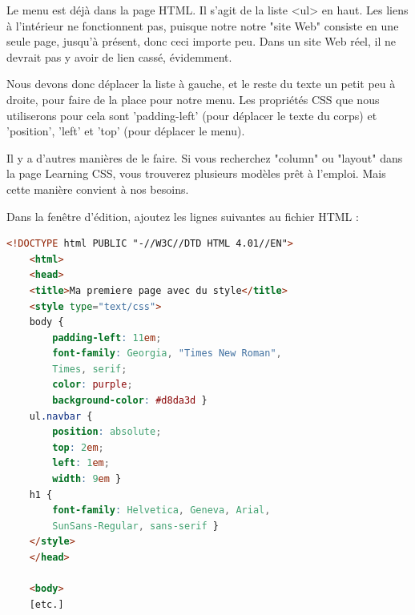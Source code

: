 Le menu est déjà dans la page HTML. Il s'agit de la liste <ul> en haut. Les liens à l'intérieur ne fonctionnent pas, puisque notre notre "site Web" consiste en une seule page, jusqu'à présent, donc ceci importe peu. Dans un site Web réel, il ne devrait pas y avoir de lien cassé, évidemment.

Nous devons donc déplacer la liste à gauche, et le reste du texte un petit peu à droite, pour faire de la place pour notre menu. Les propriétés CSS que nous utiliserons pour cela sont 'padding-left' (pour déplacer le texte du corps) et 'position', 'left' et 'top' (pour déplacer le menu).

Il y a d'autres manières de le faire. Si vous recherchez "column" ou "layout" dans la page Learning CSS, vous trouverez plusieurs modèles prêt à l'emploi. Mais cette manière convient à nos besoins.

Dans la fenêtre d'édition, ajoutez les lignes suivantes au fichier HTML : 
\begin{lstlisting}[language=html]
	<!DOCTYPE html PUBLIC "-//W3C//DTD HTML 4.01//EN">
	<html>
	<head>
	<title>Ma premiere page avec du style</title>
	<style type="text/css">
	body {
		padding-left: 11em;
		font-family: Georgia, "Times New Roman",
		Times, serif;
		color: purple;
		background-color: #d8da3d }
	ul.navbar {
		position: absolute;
		top: 2em;
		left: 1em;
		width: 9em }
	h1 {
		font-family: Helvetica, Geneva, Arial,
		SunSans-Regular, sans-serif }
	</style>
	</head>
	
	<body>
	[etc.]
\end{lstlisting}

